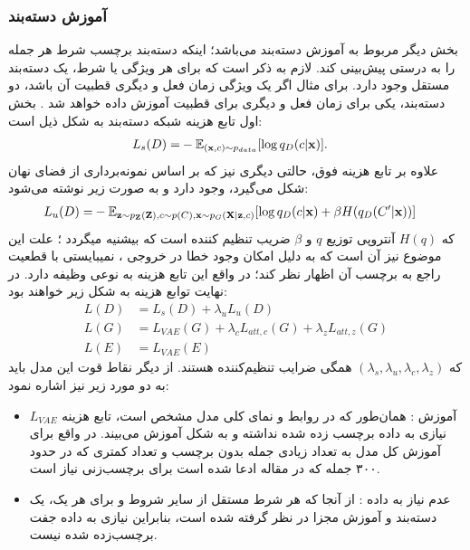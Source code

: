 \subsubsection*{آموزش دسته‌بند}
بخش دیگر مربوط به آموزش دسته‌بند می‌باشد؛ اینکه دسته‌بند برچسب شرط هر جمله را به درستی پیش‌بینی کند. لازم به ذکر است که برای هر ویژگی یا شرط، یک دسته‌بند مستقل وجود دارد. برای مثال اگر یک ویژگی زمان فعل و دیگری قطبیت آن باشد، دو دسته‌بند، یکی برای زمان فعل و دیگری برای قطبیت آموزش داده خواهد شد \cite{toward}. بخش اول تابع هزینه شبکه دسته‌بند به شکل ذیل است:
\begin{equation}
	\begin{split}
		L_{s} (D) =& -\mathbb E_{({\bf x},c) \sim p_{data}} [\log q_D(c|{\bf x})].
	\end{split}
\end{equation}
علاوه بر تابع هزینه فوق، حالتی دیگری نیز که بر اساس نمونه‌برداری از فضای نهان شکل می‌گیرد، وجود دارد و به صورت زیر نوشته می‌شود:
\begin{equation}
	\begin{split}
		L_{u} (D) =& -\mathbb E_{{\bf z} \sim p_{\bf Z}({\bf Z}), c \sim p(C), {\bf x} \sim p_G({\bf X}|{\bf z},c)} [\log q_D(c|{\bf x}) + \beta H(q_D(C'|{\bf x}))]
	\end{split}
\end{equation}
که $H(q)$ آنتروپی توزیع $q$ و $\beta$ ضریب تنظیم کننده است که بیشنیه میگردد \cite{toward}؛ علت این موضوع نیز آن است که به دلیل امکان وجود خطا در خروجی \decoder{}، \classifier{} نمیبایستی با قطعیت راجع به برچسب آن اظهار نظر کند؛ در واقع این تابع هزینه به نوعی وظیفه \augmentation{} دارد.
در نهایت توابع هزینه به شکل زیر خواهند بود:
\begin{equation}
	\begin{split}
		L (D) &= L_{s} (D) + \lambda_u L_{u} (D)\\
		L (G) &= L_{VAE} (G) + \lambda_c L_{att, c} (G) + \lambda_z L_{att, z} (G)\\
		L (E) &= L_{VAE} (E)
	\end{split}
\end{equation}
که $(\lambda_s, \lambda_u, \lambda_c , \lambda_z)$ همگی ضرایب تنظیم‌کننده هستند. از دیگر نقاط قوت این مدل باید به دو مورد زیر نیز اشاره نمود:
\renewcommand{\labelitemi}{$\bullet$}
\begin{itemize}
	\item

	      آموزش
          :
	      همان‌طور که در روابط و نمای کلی مدل مشخص است، تابع هزینه $L_{VAE}$ نیازی به داده برچسب زده شده نداشته و به شکل \semisupervised{} آموزش می‌بیند. در واقع برای آموزش کل مدل به تعداد زیادی جمله بدون برچسب و تعداد کمتری که در حدود ۳۰۰ جمله که در مقاله ادعا شده است برای برچسب‌زنی نیاز است.
	\item
	      عدم نیاز به داده 
          :
	      از آنجا که هر شرط مستقل از سایر شروط و برای هر یک، یک دسته‌بند و آموزش مجزا در نظر گرفته شده است، بنابراین نیازی به داده جفت برچسب‌زده شده نیست.
\end{itemize}

